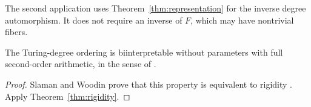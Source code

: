 The second application uses Theorem~\ref{thm:representation}
for the inverse degree automorphism. It does not require
an inverse of $F$, which may have nontrivial fibers.

\begin{corollary}\label{cor:biinterpretability}
The Turing-degree ordering is biinterpretable without parameters
with full second-order arithmetic, in the sense of
\cite[Definition~7.5.1]{SlamanWoodin2005}.
\end{corollary}

\begin{proof}
Slaman and Woodin prove that this property is equivalent to
rigidity \cite[Theorem~7.5.3]{SlamanWoodin2005}.
Apply Theorem~\ref{thm:rigidity}.
\end{proof}
